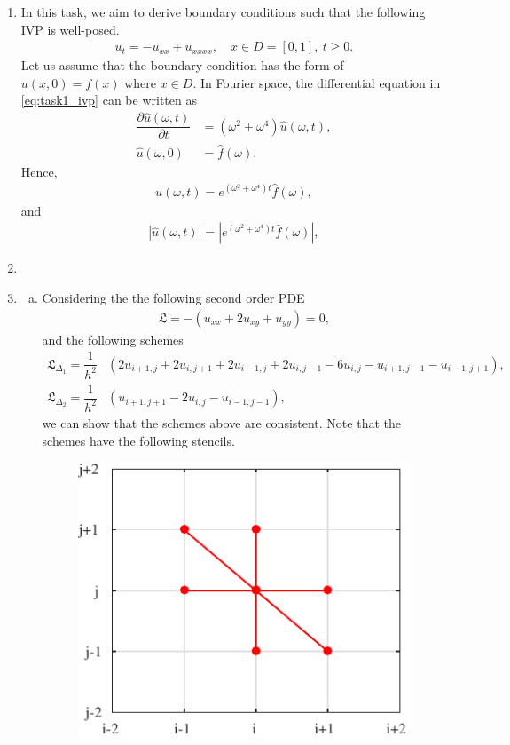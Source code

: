 \documentclass[10pt,a4paper,twoside, french]{article}
\numberwithin{equation}{section}
\numberwithin{figure}{section}
\numberwithin{table}{section}
\begin{document}
\setcounter{section}{1}
\begin{enumerate}
\item In this task, we aim to derive boundary conditions such that the following IVP is well-posed.
\begin{align}
u_t=-u_{xx}+u_{xxxx},\quad x\in D=[0,1],~t\geq0.
\label{eq:task1_ivp}
\end{align}
Let us assume that the boundary condition has the form of $u(x,0)=f(x)$ where $x\in D$. In Fourier space, the differential equation in \eqref{eq:task1_ivp} can be written as
\begin{align}
\dfrac{\partial \hat{u}(\omega,t)}{\partial t} &= (\omega^2+\omega^4) \hat{u}(\omega,t),\\
\hat{u}(\omega,0) &= \hat{f}(\omega).
\end{align}
Hence,
\begin{align}
\hat{u}(\omega,t) = e^{(\omega^2+\omega^4)t}\hat{f}(\omega),
\end{align}
and
\begin{align}
|\hat{u}(\omega,t)| = |e^{(\omega^2+\omega^4)t}\hat{f}(\omega)|,
\end{align}
\item 
\item \begin{enumerate}[a.]
\item Considering the the following second order PDE
\begin{align}
\mathfrak{L} = -(u_{xx}+2u_{xy}+u_{yy})=0,
\label{eq:task3_pde}
\end{align}
and the following schemes
\begin{align}
\mathfrak{L}_{\Delta_1}=\dfrac{1}{h^2}&(2u_{i+1,j}+2u_{i,j+1}+2u_{i-1,j}+2u_{i,j-1}-6u_{i,j}-u_{i+1,j-1}-u_{i-1,j+1}),\\
\mathfrak{L}_{\Delta_2}=\dfrac{1}{h^2}&(u_{i+1,j+1}-2u_{i,j}-u_{i-1,j-1}),
\end{align}
we can show that the schemes above are consistent. Note that the schemes have the following stencils.
\begin{figure}[h]
\centering
\includegraphics[scale=.8]{fig/scheme1}

\end{figure}
\end{enumerate}
\end{enumerate}
\end{document}
